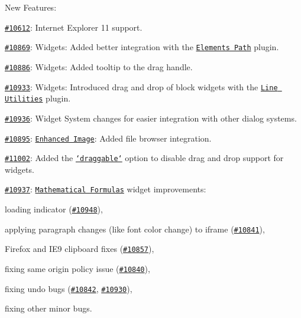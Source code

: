 New Features\-:
\begin{DoxyItemize}
\item \href{http://dev.ckeditor.com/ticket/10612}{\tt \#10612}\-: Internet Explorer 11 support.
\item \href{http://dev.ckeditor.com/ticket/10869}{\tt \#10869}\-: Widgets\-: Added better integration with the \href{http://ckeditor.com/addon/elementspath}{\tt Elements Path} plugin.
\item \href{http://dev.ckeditor.com/ticket/10886}{\tt \#10886}\-: Widgets\-: Added tooltip to the drag handle.
\item \href{http://dev.ckeditor.com/ticket/10933}{\tt \#10933}\-: Widgets\-: Introduced drag and drop of block widgets with the \href{http://ckeditor.com/addon/lineutils}{\tt Line Utilities} plugin.
\item \href{http://dev.ckeditor.com/ticket/10936}{\tt \#10936}\-: Widget System changes for easier integration with other dialog systems.
\item \href{http://dev.ckeditor.com/ticket/10895}{\tt \#10895}\-: \href{http://ckeditor.com/addon/image2}{\tt Enhanced Image}\-: Added file browser integration.
\item \href{http://dev.ckeditor.com/ticket/11002}{\tt \#11002}\-: Added the \href{http://docs.ckeditor.com/#!/api/CKEDITOR.plugins.widget.definition-property-draggable}{\tt `draggable`} option to disable drag and drop support for widgets.
\item \href{http://dev.ckeditor.com/ticket/10937}{\tt \#10937}\-: \href{http://ckeditor.com/addon/mathjax}{\tt Mathematical Formulas} widget improvements\-:
\begin{DoxyItemize}
\item loading indicator (\href{http://dev.ckeditor.com/ticket/10948}{\tt \#10948}),
\item applying paragraph changes (like font color change) to iframe (\href{http://dev.ckeditor.com/ticket/10841}{\tt \#10841}),
\item Firefox and I\-E9 clipboard fixes (\href{http://dev.ckeditor.com/ticket/10857}{\tt \#10857}),
\item fixing same origin policy issue (\href{http://dev.ckeditor.com/ticket/10840}{\tt \#10840}),
\item fixing undo bugs (\href{http://dev.ckeditor.com/ticket/10842}{\tt \#10842}, \href{http://dev.ckeditor.com/ticket/10930}{\tt \#10930}),
\item fixing other minor bugs.
\end{DoxyItemize}

\end{DoxyItemize}
